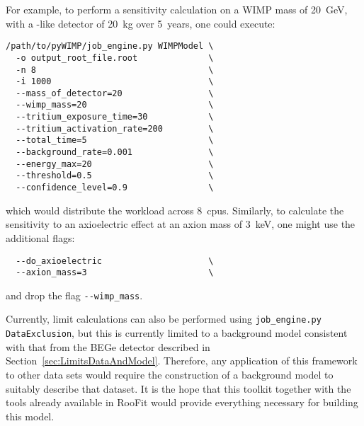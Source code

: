 For example, to perform a sensitivity calculation on a WIMP mass of 20~GeV, with a \MJ-like detector
of 20~kg over 5~years, one could execute:
				\begin{lstlisting}
/path/to/pyWIMP/job_engine.py WIMPModel	\
  -o output_root_file.root 				\
  -n 8 									\
  -i 1000 								\
  --mass_of_detector=20 				\
  --wimp_mass=20 						\
  --tritium_exposure_time=30			\
  --tritium_activation_rate=200			\
  --total_time=5 						\
  --background_rate=0.001 				\
  --energy_max=20 						\
  --threshold=0.5 						\ 
  --confidence_level=0.9 				\
				\end{lstlisting}
which would distribute the workload across 8~cpus.  Similarly, to calculate the sensitivity to an axioelectric effect at an axion
mass of 3~keV, one might use the additional flags:
				\begin{lstlisting}
  --do_axioelectric						\
  --axion_mass=3 						\
				\end{lstlisting}
and drop the flag \lstinline!--wimp_mass!.  

Currently, limit calculations can also be performed using \lstinline!job_engine.py DataExclusion!, but this is currently limited
to a background model consistent with that from the BEGe detector described in Section~\ref{sec:LimitsDataAndModel}.  Therefore, any application of this framework to other data sets would require the construction of a background model to suitably 
describe that dataset.  It is the hope that this toolkit together with the tools already available in RooFit would provide
everything necessary for building this model.
